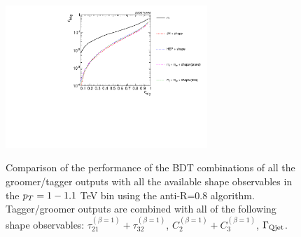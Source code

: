 \begin{figure}
\centering
{\includegraphics[width=0.68\textwidth]{./Figures/TTagging/multi_variable/pT.1TeV.R.0.8/Rocs_optimum.pdf}}
\caption{Comparison of the performance of the BDT combinations of all the groomer/tagger outputs with all the available shape observables in the $p_T = 1-1.1$ TeV bin using the anti-\kT R=0.8 algorithm. Tagger/groomer outputs are combined with all of the following shape observables: $\tau_{21}^{(\beta=1)}+\tau_{32}^{(\beta=1)}$, $C_{2}^{(\beta=1)}+C_{3}^{(\beta=1)}$, $\Gamma_{\rm Qjet}$.}
\label{fig:pt1000_allcompare_AKt_R08_Final}
\end{figure}


